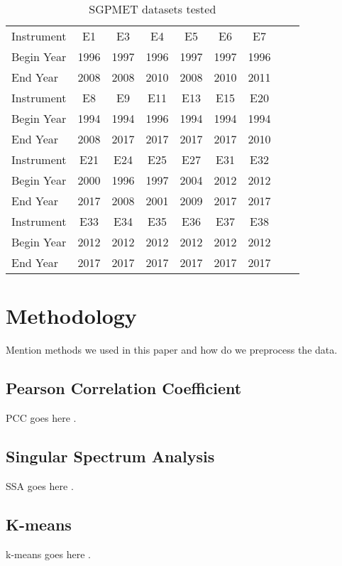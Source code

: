 \documentclass[letterpaper, 10 pt, conference]{ieeeconf}  %
\begin{document}
\begin{table}[h]
\caption{SGPMET datasets tested}
\label{tab:template}
\centering
\begin{tabular}{|l|c|c|c|c|c|c|c|c|}
\hline
Instrument & E1 & E3 & E4 & E5 & E6 & E7\\
Begin Year & 1996 & 1997 & 1996 & 1997 & 1997 & 1996\\
End Year & 2008 & 2008 & 2010 & 2008 & 2010 & 2011\\
\hline
Instrument & E8 & E9 & E11 & E13 & E15 & E20\\
Begin Year & 1994 & 1994 & 1996 & 1994 & 1994 & 1994\\
End Year & 2008 & 2017 & 2017 & 2017 & 2017 & 2010\\
\hline
Instrument & E21 & E24 & E25 & E27 & E31 & E32\\
Begin Year & 2000 & 1996 & 1997 & 2004 & 2012 & 2012\\
End Year & 2017 & 2008 & 2001 & 2009 & 2017 & 2017\\
\hline
Instrument & E33 & E34 & E35 & E36 & E37 & E38\\
Begin Year & 2012 & 2012 & 2012 & 2012 & 2012 & 2012\\
End Year & 2017 & 2017 & 2017 & 2017 & 2017 & 2017\\
\hline
\end{tabular}
\end{table}


\section{Methodology}
Mention methods we used in this paper and how do we preprocess the data.

\subsection{Pearson Correlation Coefficient} 
PCC goes here \cite{pearson1895note}.

\subsection{Singular Spectrum Analysis}
SSA goes here \cite{golyandina2013singular, alexandrov2008method}.

\subsection{K-means}
k-means goes here \cite{hartigan1979algorithm}.
\end{document}
